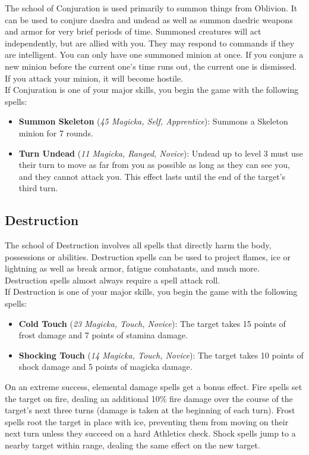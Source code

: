 The school of Conjuration is used primarily to summon things from Oblivion. It can be used to conjure daedra and undead as well as summon daedric weapons and armor for very brief periods of time. Summoned creatures will act independently, but are allied with you. They may respond to commands if they are intelligent. You can only have one summoned minion at once. If you conjure a new minion before the current one's time runs out, the current one is dismissed. If you attack your minion, it will become hostile.\\

If Conjuration is one of your major skills, you begin the game with the following spells:
\begin{itemize}
	\item \textbf{Summon Skeleton} (\textit{45 Magicka, Self, Apprentice}): Summons a Skeleton minion for 7 rounds.
	\item \textbf{Turn Undead} (\textit{11 Magicka, Ranged, Novice}): Undead up to level 3 must use their turn to move as far from you as possible as long as they can see you, and they cannot attack you. This effect lasts until the end of the target's third turn.
\end{itemize}

\subsection{Destruction}
The school of Destruction involves all spells that directly harm the body, possessions or abilities. Destruction spells can be used to project flames, ice or lightning as well as break armor, fatigue combatants, and much more. Destruction spells almost always require a spell attack roll.\\

If Destruction is one of your major skills, you begin the game with the following spells:
\begin{itemize}
	\item \textbf{Cold Touch} (\textit{23 Magicka, Touch, Novice}): The target takes 15 points of frost damage and 7 points of stamina damage.
	\item \textbf{Shocking Touch} (\textit{14 Magicka, Touch, Novice}): The target takes 10 points of shock damage and 5 points of magicka damage.
\end{itemize}

On an extreme success, elemental damage spells get a bonus effect. Fire spells set the target on fire, dealing an additional 10\% fire damage over the course of the target's next three turns (damage is taken at the beginning of each turn). Frost spells root the target in place with ice, preventing them from moving on their next turn unless they succeed on a hard Athletics check. Shock spells jump to a nearby target within range, dealing the same effect on the new target.\\

